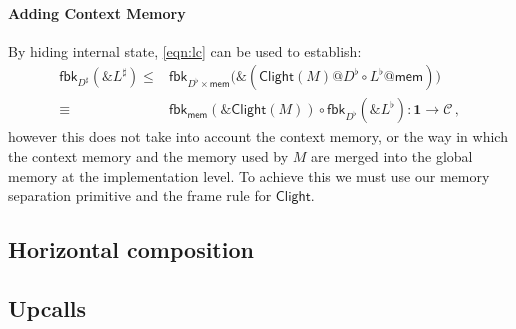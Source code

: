 \documentclass[acmsmall,screen,review,anonymous]{acmart}
\newcommand{\kw}[1]{\ensuremath{ \mathsf{#1} }}
\begin{document}
\paragraph{Adding Context Memory}

By hiding internal state,
\autoref{eqn:lc} can be used to establish:
\begin{align*}
  \kw{fbk}_{D^\sharp}(\&L^\sharp) \le {} &
  \kw{fbk}_{D^\flat \times \kw{mem}} \big(
    \&(\kw{Clight}(M)@D^\flat \circ L^\flat@\kw{mem})
    \big) \\ \equiv {} &
  \kw{fbk}_\kw{mem}(\&\kw{Clight}(M)) \circ \kw{fbk}_{D^\flat}(\&L^\flat)
  : \mathbf{1} \rightarrow \mathcal{C}
  \,,
\end{align*}
however this does not take into account the context memory,
or the way in which the context memory and the memory used by $M$
are merged into the global memory
at the implementation level.
To achieve this we must use our memory separation primitive
and the frame rule for $\kw{Clight}$.



\subsection{Horizontal composition} %


\subsection{Upcalls} %
\end{document}
